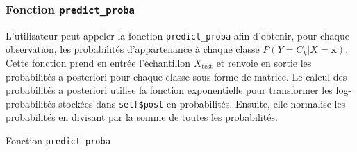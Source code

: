 \documentclass[]{article}
\begin{document}
\subsubsection{Fonction \texttt{predict\_proba}}

L'utilisateur peut appeler la fonction \texttt{predict\_proba} afin d'obtenir, pour chaque observation, les probabilités d'appartenance à chaque classe \(P(Y = C_k | X = \mathbf{x})\). Cette fonction prend en entrée l'échantillon \(X_{\text{test}}\) et renvoie en sortie les probabilités a posteriori pour chaque classe sous forme de matrice. Le calcul des probabilités a posteriori utilise la fonction exponentielle pour transformer les log-probabilités stockées dans \texttt{self\$post} en probabilités. Ensuite, elle normalise les probabilités en divisant par la somme de toutes les probabilités.
\newpage
\begin{algorithm}
    \caption{Fonction \texttt{predict\_proba}}


\end{algorithm}
\vspace{0.5\baselineskip}
\end{document}
